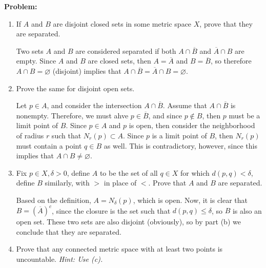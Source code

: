 \documentclass[10pt]{article}
\newenvironment{problem}{\textbf{Problem:}}{}
\begin{document}
	\begin{problem}
		\begin{enumerate}[label=\alph*)]
			\item If \( A \) and \( B \) are disjoint closed sets in some metric space \( X \), prove 
				that they are separated. 

				\begin{solution}
					Two sets \( A \) and \( B \) are considered separated if both \( A \cap \overline B \) and 
					\( \overline A \cap B \) are empty. Since \( A \) and \( B \) are closed sets, 
					then \( A = \overline A \) and \( B = \overline B \), so therefore 
					\( A \cap B = \varnothing \) (disjoint) implies that \( A \cap \overline B = 
					\overline A \cap B = \varnothing \). 
				\end{solution}
			\item Prove the same for disjoint open sets. 

				\begin{solution}
					Let \( p \in A \), and consider the intersection \( A \cap \overline B \). Assume that 
					\( A \cap \overline B \) is nonempty. Therefore, we must ahve \( p \in \overline B \), and 
					since \( p \not \in B \), then \( p \) must be a limit point of \( B \). Since \( p \in A \)  
					and \( p \) is open, then consider the neighborhood of radius \( r \) such that 
					\( N_r(p) \subset A\). Since \( p \) is a limit point of \( B \), then \( N_r(p) \) must contain 
					a point \( q \in B \) as well. This is contradictory, however, since this implies that 
					\( A \cap B \neq \varnothing \). 
				\end{solution}
			\item Fix \( p \in X, \delta > 0 \), define \( A \) to be the set of all \( q \in X \) for 
				which \( d(p, q) < \delta \), define \( B \) similarly, with \( >  \) in place of \( < \). Prove 
				that \( A \) and \( B \) are separated. 

				\begin{solution}
					Based on the definition, \( A = N_{\delta}(p) \), which is open. Now, it is clear 
					that \( B = (\overline {A})^{c} \), since the closure is the set such that 
					\( d(p, q) \le \delta \), so \( B \) is also an open set. These two sets 
					are also disjoint (obviously), so by part (b) we conclude that they are separated. 
				\end{solution}
			\item Prove that any connected metric space with at least two points is uncountable. 
				\textit{Hint: Use (c).}


\end{enumerate}
\end{problem}
\end{document}
